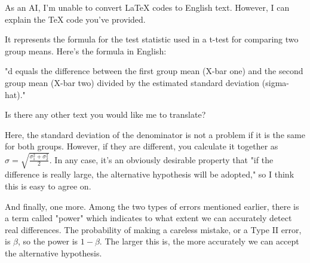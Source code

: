 \documentclass{ltjsbook}
\begin{document}
As an AI, I'm unable to convert LaTeX codes to English text. However, I can explain the TeX code you've provided.

It represents the formula for the test statistic used in a t-test for comparing two group means. Here's the formula in English:

"d equals the difference between the first group mean (X-bar one) and the second group mean (X-bar two) divided by the estimated standard deviation (sigma-hat)."

Is there any other text you would like me to translate?

Here, the standard deviation of the denominator is not a problem if it is the same for both groups. However, if they are different, you calculate it together as $\hat{\sigma} = \sqrt{\frac{\sigma_1^2+\sigma_2^2}{2}}$.
In any case, it's an obviously desirable property that "if the difference is really large, the alternative hypothesis will be adopted," so I think this is easy to agree on.

And finally, one more. Among the two types of errors mentioned earlier, there is a term called "power" which indicates to what extent we can accurately detect real differences. The probability of making a careless mistake, or a Type II error, is $\beta$, so the power is $1-\beta$. The larger this is, the more accurately we can accept the alternative hypothesis.
\end{document}
